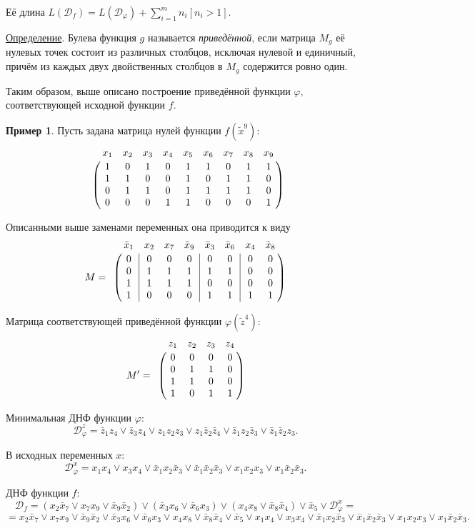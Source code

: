\documentclass[12pt,a4paper,oneside,fleqn,leqno]{article}
\theoremstyle{definition}
\newtheorem{example}{Пример}%
\def\VR{\kern-\arraycolsep\strut\vrule &\kern-\arraycolsep}
\def\vr{\kern-\arraycolsep & \kern-\arraycolsep}
\begin{document}
			Её длина $L(\mathcal{D}_f) = L(\mathcal{D}_{\varphi}) + \sum\limits_{i = 1}^m n_i[n_i > 1].$\par
			\underline{Определение}. Булева функция $g$ называется {\it приведённой}, если матрица $M_g$ её нулевых точек состоит из различных столбцов, исключая нулевой и единичный, причём из каждых двух двойственных столбцов в $M_g$ содержится ровно один.\par
			Таким образом, выше описано построение приведённой функции $\varphi,$ соответствующей исходной функции $f.$
			\begin{example}
				Пусть задана матрица нулей функции $f(\tilde x^9)$:
				$$
					\bordermatrix{
						& x_1& x_2 & x_3 & x_4 & x_5 & x_6 & x_7 & x_8 & x_9\cr
						&1 &0 &1 &0& 1& 1& 0& 1& 1\cr
						&1 &1& 0& 0& 1& 0& 1& 1& 0\cr
						&0 &1 &1& 0& 1& 1& 1& 1& 0\cr
						&0 &0 &0 &1& 1& 0& 0& 0& 1
					}
				$$\par
				Описанными выше заменами переменных она приводится к виду
				$$
					M = \bordermatrix{
						& \bar{x}_1& \vr x_2 & x_7 & \bar{x}_9 & \vr \bar{x}_3 & \bar{x}_6 & \vr x_4 & \bar{x}_8\cr
						&0 & \VR 0 &0 &0 & \VR 0& 0& \VR 0& 0\cr
						&0 & \VR 1 &1 &1 & \VR 1& 1& \VR 0& 0\cr
						&1 & \VR 1 &1 &1 & \VR 0& 0& \VR 0& 0\cr
						&1 & \VR 0 &0 &0 & \VR 1& 1& \VR 1& 1
					}
				$$\par
				Матрица соответствующей приведённой функции $\varphi(\tilde z^4)$:
				$$
					M' = \bordermatrix{
						& z_1& z_2 & z_3 & z_4\cr
						&0 &0 &0 &0\cr
						&0 &1 &1 & 0\cr
						&1 &1 &0 & 0\cr
						&1 &0 &1 &1
					}
				$$\par
				Минимальная ДНФ функции $\varphi$:
				$$
					\mathcal{D}_{\varphi}^z = \bar{z}_1z_4 \vee \bar{z}_3z_4 \vee z_1z_2z_3 \vee z_1\bar{z}_2\bar{z}_4 \vee \bar{z}_1z_2\bar{z}_3 \vee \bar{z}_1\bar{z}_2z_3.
				$$\par
				В исходных переменных $x$:
				$$
					\mathcal{D}_{\varphi}^x = x_1x_4 \vee x_3x_4 \vee \bar{x}_1x_2\bar{x}_3 \vee \bar{x}_1\bar{x}_2\bar{x}_3 \vee x_1x_2x_3 \vee x_1\bar{x}_2\bar{x}_3.
				$$\par
				ДНФ функции $f$:
				$$
					\mathcal{D}_f = (x_2\bar{x}_7 \vee x_7x_9 \vee \bar{x}_9\bar{x}_2) \vee (\bar{x}_3x_6 \vee \bar{x}_6x_3) \vee (x_4x_8 \vee \bar{x}_8\bar{x}_4) \vee \bar{x}_5 \vee \mathcal{D}_{\varphi}^x = $$ $$
					= x_2\bar{x}_7 \vee x_7x_9 \vee \bar{x}_9\bar{x}_2 \vee \bar{x}_3x_6 \vee \bar{x}_6x_3 \vee x_4x_8 \vee \bar{x}_8\bar{x}_4 \vee \bar{x}_5 \vee x_1x_4 \vee x_3x_4 \vee \bar{x}_1x_2\bar{x}_3 \vee \bar{x}_1\bar{x}_2\bar{x}_3 \vee x_1x_2x_3 \vee x_1\bar{x}_2\bar{x}_3.
				$$
			\end{example}
\end{document}
